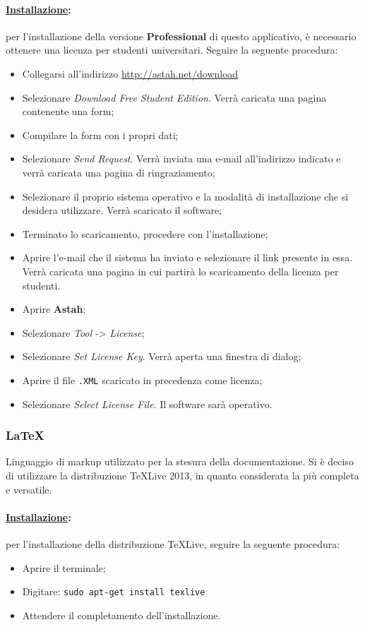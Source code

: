 \paragraph{\underline{Installazione}:} per l'installazione della versione \textbf{Professional} di questo applicativo, è necessario ottenere una licenza per studenti universitari. Seguire la seguente procedura:
\begin{itemize}
\item Collegarsi all'indirizzo \url{http://astah.net/download}
\item Selezionare \textit{Download Free Student Edition}. Verrà caricata una pagina contenente una form;
\item Compilare la form con i propri dati;
\item Selezionare \textit{Send Request}. Verrà inviata una e-mail all'indirizzo indicato e verrà caricata una pagina di ringraziamento;
\item Selezionare il proprio sistema operativo e la modalità di installazione che si desidera utilizzare. Verrà scaricato il software;
\item Terminato lo scaricamento, procedere con l'installazione;
\item Aprire l'e-mail che il sistema ha inviato e selezionare il link presente in essa. Verrà caricata una pagina in cui partirà lo scaricamento della licenza per studenti.
\item Aprire \textbf{Astah};
\item Selezionare \textit{Tool} -> \textit{License};
\item Selezionare \textit{Set License Key}. Verrà aperta una finestra di dialog;
\item Aprire il file \verb!.XML! scaricato in precedenza come licenza;
\item Selezionare \textit{Select License File}. Il software sarà operativo.
\end{itemize}

\subsubsection{\LaTeX}
\label{latex}
Linguaggio di markup\g{} utilizzato per la stesura della documentazione. Si è deciso di utilizzare la distribuzione \TeX Live 2013, in quanto considerata la più completa e versatile.

\paragraph{\underline{Installazione}:} per l'installazione della distribuzione \TeX Live, seguire la seguente procedura:
\begin{itemize}
\item Aprire il terminale;
\item Digitare: \verb!sudo apt-get install texlive!
\item Attendere il completamento dell'installazione.
\end{itemize}

